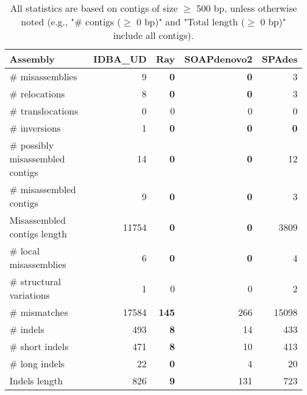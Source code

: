 \documentclass[12pt,a4paper]{article}
\begin{document}
\begin{table}[ht]
\begin{center}
\caption{All statistics are based on contigs of size $\geq$ 500 bp, unless otherwise noted (e.g., "\# contigs ($\geq$ 0 bp)" and "Total length ($\geq$ 0 bp)" include all contigs).}
\begin{tabular}{|l*{4}{|r}|}
\hline
Assembly & IDBA\_UD & Ray & SOAPdenovo2 & SPAdes \\ \hline
\# misassemblies & 9 & {\bf 0} & {\bf 0} & 3 \\ \hline
\hspace{5mm}\# relocations & 8 & {\bf 0} & {\bf 0} & 3 \\ \hline
\hspace{5mm}\# translocations & 0 & 0 & 0 & 0 \\ \hline
\hspace{5mm}\# inversions & 1 & {\bf 0} & {\bf 0} & {\bf 0} \\ \hline
\# possibly misassembled contigs & 14 & {\bf 0} & {\bf 0} & 12 \\ \hline
\# misassembled contigs & 9 & {\bf 0} & {\bf 0} & 3 \\ \hline
Misassembled contigs length & 11754 & {\bf 0} & {\bf 0} & 3809 \\ \hline
\# local misassemblies & 6 & {\bf 0} & {\bf 0} & 4 \\ \hline
\# structural variations & 1 & 0 & 0 & 2 \\ \hline
\# mismatches & 17584 & {\bf 145} & 266 & 15098 \\ \hline
\# indels & 493 & {\bf 8} & 14 & 433 \\ \hline
\hspace{5mm}\# short indels & 471 & {\bf 8} & 10 & 413 \\ \hline
\hspace{5mm}\# long indels & 22 & {\bf 0} & 4 & 20 \\ \hline
Indels length & 826 & {\bf 9} & 131 & 723 \\ \hline
\end{tabular}
\end{center}
\end{table}
\end{document}
